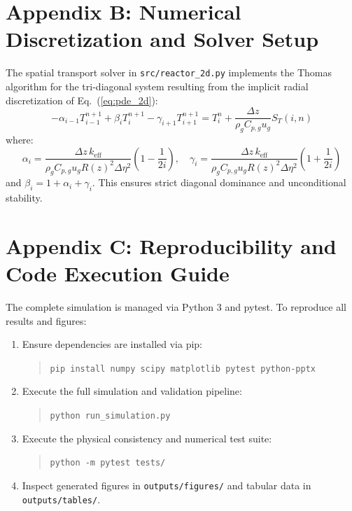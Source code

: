\documentclass[11pt,a4paper]{article}
\begin{document}
\section{Appendix B: Numerical Discretization and Solver Setup}
The spatial transport solver in \texttt{src/reactor\_2d.py} implements the Thomas algorithm for the tri-diagonal system resulting from the implicit radial discretization of Eq.~(\ref{eq:pde_2d}):
\begin{equation}
    -\alpha_{i-1} T_{i-1}^{n+1} + \beta_i T_i^{n+1} - \gamma_{i+1} T_{i+1}^{n+1} = T_i^n + \frac{\Delta z}{\rho_g C_{p,g} u_g} S_T(i, n)
\end{equation}
where:
\begin{equation}
    \alpha_i = \frac{\Delta z \, k_{\text{eff}}}{\rho_g C_{p,g} u_g R(z)^2 \Delta \eta^2} \left(1 - \frac{1}{2 i}\right), \quad \gamma_i = \frac{\Delta z \, k_{\text{eff}}}{\rho_g C_{p,g} u_g R(z)^2 \Delta \eta^2} \left(1 + \frac{1}{2 i}\right)
\end{equation}
and $\beta_i = 1 + \alpha_i + \gamma_i$. This ensures strict diagonal dominance and unconditional stability.

\section{Appendix C: Reproducibility and Code Execution Guide}
The complete simulation is managed via Python 3 and pytest. To reproduce all results and figures:
\begin{enumerate}
    \item Ensure dependencies are installed via pip:
    \begin{quote}
        \texttt{pip install numpy scipy matplotlib pytest python-pptx}
    \end{quote}
    \item Execute the full simulation and validation pipeline:
    \begin{quote}
        \texttt{python run\_simulation.py}
    \end{quote}
    \item Execute the physical consistency and numerical test suite:
    \begin{quote}
        \texttt{python -m pytest tests/}
    \end{quote}
    \item Inspect generated figures in \texttt{outputs/figures/} and tabular data in \texttt{outputs/tables/}.
\end{enumerate}
\end{document}
